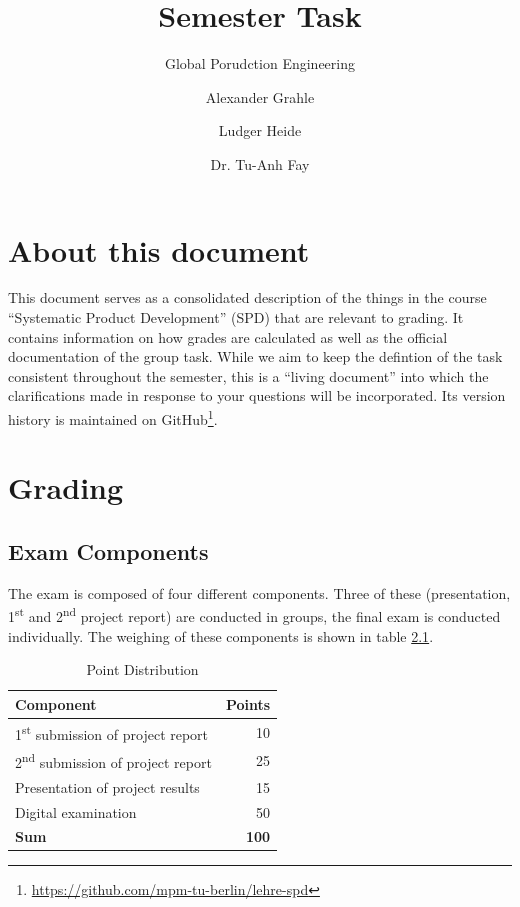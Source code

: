 \documentclass[headinclude=true]{scrreprt}
\begin{document}
\title{Semester Task}
\subtitle{Global Porudction Engineering}
\author{Alexander Grahle \and Ludger Heide \and Dr. Tu-Anh Fay}
\maketitle

\tableofcontents


\clearpage
\chapter{About this document}

This document serves as a consolidated description of the things in the course ``Systematic Product Development'' (SPD) that are relevant to grading. It contains information on how grades are calculated as well as the official documentation of the group task. While we aim to keep the defintion of the task consistent throughout the semester, this is a ``living document'' into which the clarifications made in response to your questions will be incorporated. Its version history is maintained on GitHub\footnote{\url{https://github.com/mpm-tu-berlin/lehre-spd}}. 

\chapter{Grading}

\section{Exam Components}

The exam is composed of four different components. Three of these (presentation, 1\textsuperscript{st} and 2\textsuperscript{nd} project report) are conducted in groups, the final exam is conducted individually. The weighing of these components is shown in table \ref{tab:komponenten}.

\begin{table} \centering
 \caption{Point Distribution}
 \label{tab:komponenten}
 \begin{tabular}{lr}
  \toprule
  Component & Points \\ \midrule
  1\textsuperscript{st} submission of project report & 10 \\ 
  2\textsuperscript{nd} submission of project report & 25 \\ 
  Presentation of project results & 15 \\ 
  Digital examination & 50 \\ \midrule
  \textbf{Sum} & \textbf{100} \\ \bottomrule
 \end{tabular}
\end{table}
\end{document}
